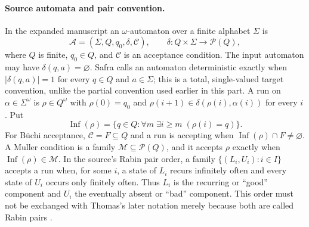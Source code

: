 \paragraph{Source automata and pair convention.}
In the expanded manuscript an \(\omega\)-automaton over a finite alphabet
\(\Sigma\) is
\[
  \mathcal A=(\Sigma,Q,q_0,\delta,\mathcal C),
  \qquad
  \delta:Q\times\Sigma\longrightarrow\mathcal P(Q),
\]
where \(Q\) is finite, \(q_0\in Q\), and \(\mathcal C\) is an acceptance
condition.  The input automaton may have \(\delta(q,a)=\varnothing\).  Safra
calls an automaton deterministic exactly when
\(|\delta(q,a)|=1\) for every \(q\in Q\) and \(a\in\Sigma\); this is a total,
single-valued target convention, unlike the partial convention used earlier in
this part.  A run on \(\alpha\in\Sigma^\omega\) is
\(\rho\in Q^\omega\) with \(\rho(0)=q_0\) and
\(\rho(i+1)\in\delta(\rho(i),\alpha(i))\) for every \(i\).  Put
\[
  \operatorname{Inf}(\rho)
  =\{q\in Q:\forall m\;\exists i\ge m\;(\rho(i)=q)\}.
\]
For B\"uchi acceptance, \(\mathcal C=F\subseteq Q\) and a run is accepting
when \(\operatorname{Inf}(\rho)\cap F\ne\varnothing\).  A Muller condition is
a family \(\mathcal M\subseteq\mathcal P(Q)\), and it accepts \(\rho\) exactly
when \(\operatorname{Inf}(\rho)\in\mathcal M\).  In the source's Rabin
pair order, a family \(\{(L_i,U_i):i\in I\}\) accepts a run when, for some
\(i\), a state of \(L_i\) recurs infinitely often and every state of \(U_i\)
occurs only finitely often.  Thus \(L_i\) is the recurring or ``good''
component and \(U_i\) the eventually absent or ``bad'' component.  This order
must not be exchanged with Thomas's later notation merely because both are
called Rabin pairs
\cite[pp.~2--4]{Safra1995Extended}.

